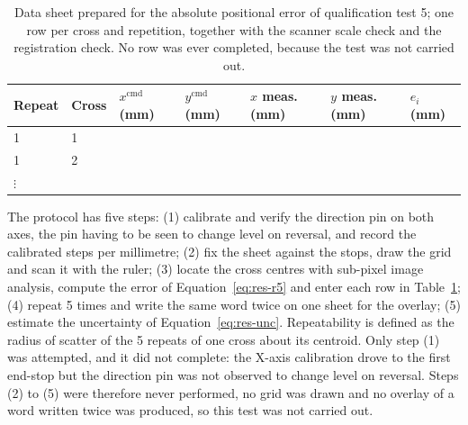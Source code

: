 \begin{table}[h]
\centering
\fontsize{10}{12}\selectfont
\begin{tabularx}{\linewidth}{|l|l|l|l|l|l|X|}
\hline
\textbf{Repeat} & \textbf{Cross} & \textbf{$x^{\mathrm{cmd}}$ (mm)} & \textbf{$y^{\mathrm{cmd}}$ (mm)} & \textbf{$x$ meas. (mm)} & \textbf{$y$ meas. (mm)} & \textbf{$e_i$ (mm)} \\
\hline
1 & 1 & & & & & \\
\hline
1 & 2 & & & & & \\
\hline
$\vdots$ & & & & & & \\
\hline
\end{tabularx}
\caption{Data sheet prepared for the absolute positional error of qualification test 5; one row per cross and repetition, together with the scanner scale check and the registration check. No row was ever completed, because the test was not carried out.}
\label{tab:res-sheet}
\end{table}


            The protocol has five steps: (1) calibrate and verify the direction pin on both axes, the pin having to be seen to change level on reversal, and record the calibrated steps per millimetre; (2) fix the sheet against the stops, draw the grid and scan it with the ruler; (3) locate the cross centres with sub-pixel image analysis, compute the error of Equation~\ref{eq:res-r5} and enter each row in Table~\ref{tab:res-sheet}; (4) repeat 5 times and write the same word twice on one sheet for the overlay; (5) estimate the uncertainty of Equation~\ref{eq:res-unc}.
            Repeatability is defined as the radius of scatter of the 5 repeats of one cross about its centroid.
            Only step (1) was attempted, and it did not complete: the X-axis calibration drove to the first end-stop but the direction pin was not observed to change level on reversal. Steps (2) to (5) were therefore never performed, no grid was drawn and no overlay of a word written twice was produced, so this test was not carried out.



